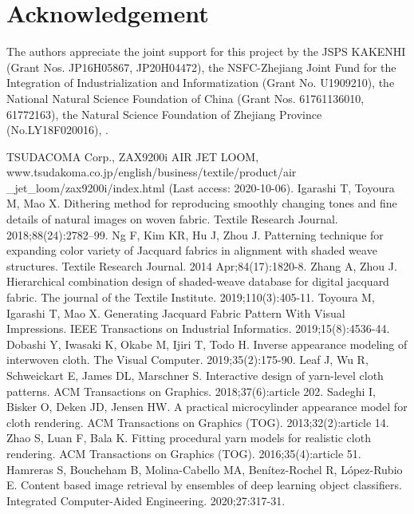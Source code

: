 \section*{Acknowledgement}
The authors appreciate the joint support for this project by the JSPS KAKENHI (Grant Nos. JP16H05867, JP20H04472), the NSFC-Zhejiang Joint Fund for the Integration of Industrialization and Informatization (Grant No. U1909210), the National Natural Science Foundation of China (Grant Nos. 61761136010, 61772163),  the Natural Science Foundation of Zhejiang Province (No.LY18F020016), .

\begin{thebibliography}{99}
 TSUDACOMA Corp., ZAX9200i AIR JET LOOM,  www.tsudakoma.co.jp/english/business/textile/product/air \_jet\_loom/zax9200i/index.html (Last access: 2020-10-06). 
 Igarashi T, Toyoura M, Mao X. Dithering method for reproducing smoothly changing tones and fine details of natural images on woven fabric. Textile Research Journal. 2018;88(24):2782–99.
 Ng F, Kim KR, Hu J, Zhou J. Patterning technique for expanding color variety of Jacquard fabrics in alignment with shaded weave structures. Textile Research Journal. 2014 Apr;84(17):1820-8.
 Zhang A, Zhou J. Hierarchical combination design of shaded-weave database for digital jacquard fabric. The journal of the Textile Institute. 2019;110(3):405-11. 
Toyoura M, Igarashi T, Mao X. Generating Jacquard Fabric Pattern With Visual Impressions. IEEE Transactions on Industrial Informatics. 2019;15(8):4536-44.
Dobashi Y, Iwasaki K, Okabe M, Ijiri T, Todo H. Inverse appearance modeling of interwoven cloth. The Visual Computer. 2019;35(2):175-90.
Leaf J, Wu R, Schweickart E, James DL, Marschner S. Interactive design of yarn-level cloth patterns. ACM Transactions on Graphics. 2018;37(6):article 202.
Sadeghi I, Bisker O, Deken JD, Jensen HW. A practical microcylinder appearance model for cloth rendering. ACM Transactions on Graphics (TOG). 2013;32(2):article 14.
Zhao S, Luan F, Bala K. Fitting procedural yarn models for realistic cloth rendering. ACM Transactions on Graphics (TOG). 2016;35(4):article 51.
Hamreras S, Boucheham B, Molina-Cabello MA, Ben\'{i}tez-Rochel R, L\'{o}pez-Rubio E. Content based image retrieval by ensembles of deep learning object classifiers. Integrated Computer-Aided Engineering. 2020;27:317-31.

\end{thebibliography}

